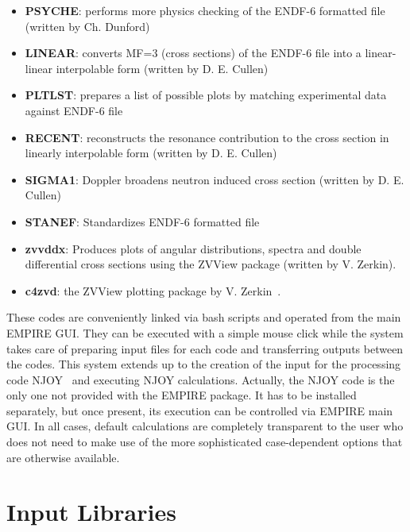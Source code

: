 \begin{itemize}
\item \textbf{PSYCHE}: performs more physics checking of the ENDF-6
formatted file (written by Ch. Dunford)

\item \textbf{LINEAR}: converts MF=3 (cross sections) of the ENDF-6 file
into a linear-linear interpolable form (written by D. E. Cullen)~\cite%
{PREPRO}

\item \textbf{PLTLST}: prepares a list of possible plots by matching
experimental data against ENDF-6 file

\item \textbf{RECENT}: reconstructs the resonance contribution to the cross
section in linearly interpolable form (written by D. E. Cullen)~\cite{PREPRO}

\item \textbf{SIGMA1}: Doppler broadens neutron induced cross section
(written by D. E. Cullen)~\cite{PREPRO}

\item \textbf{STANEF}: Standardizes ENDF-6 formatted file

\item \textbf{zvvddx}: Produces plots of angular distributions, spectra and
double differential cross sections using the ZVView package (written by V.
Zerkin).

\item \textbf{c4zvd}: the ZVView\textbf{%
} plotting package by V. Zerkin~\cite{ZVView}.
\end{itemize}

These codes are conveniently linked via bash scripts and operated from the
main EMPIRE GUI. They can be executed with a simple mouse click while the
system takes care of preparing input files for each code and transferring
outputs between the codes. This system extends up to the creation of the
input for the processing code NJOY~\cite{MacFarlane:94} and executing NJOY
calculations. Actually, the NJOY code is the only one not provided with the
EMPIRE package. It has to be installed separately, but once present, its
execution can be controlled via EMPIRE main GUI. In all cases, default
calculations are completely transparent to the user who does not need to
make use of the more sophisticated case-dependent options
that are otherwise available.

\section{Input Libraries}

